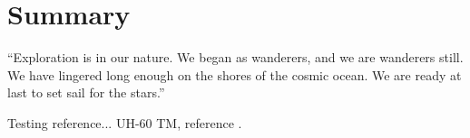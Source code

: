 \chapter{Summary}

\setlength{\parindent}{7ex}
“Exploration is in our nature. We began as wanderers, and we are wanderers still. We have lingered long enough on the shores of the cosmic ocean. We are ready at last to set sail for the stars.”

Testing reference... UH-60 TM, reference .

\pagebreak